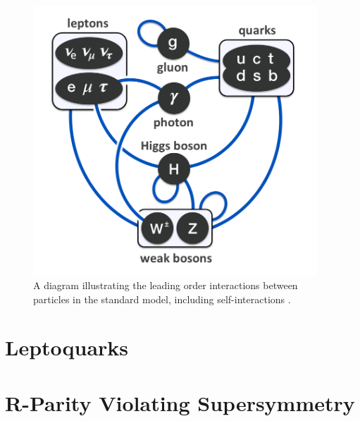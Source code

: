 \begin{figure}[hbt]
\begin{center}
\includegraphics[width=0.95\textwidth]{figures/Elementary_particle_interactions_in_the_Standard_Model.png}
\caption{A diagram illustrating the leading order interactions between particles in the standard model, including self-interactions \cite{Drexler}.}
\label{fig:sm-interactions}
\end{center}
\end{figure}

\section{Leptoquarks}

\section{R-Parity Violating Supersymmetry}